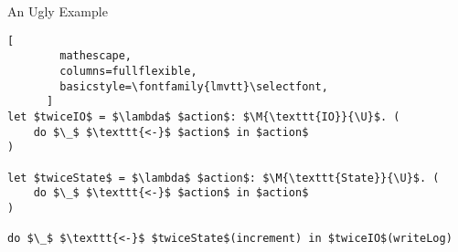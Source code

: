 
\begin{frame}[fragile]{An Ugly Example}
    \begin{lstlisting}[
        mathescape,
        columns=fullflexible,
        basicstyle=\fontfamily{lmvtt}\selectfont,
      ]
let $twiceIO$ = $\lambda$ $action$: $\M{\texttt{IO}}{\U}$. (
    do $\_$ $\texttt{<-}$ $action$ in $action$
)

let $twiceState$ = $\lambda$ $action$: $\M{\texttt{State}}{\U}$. (
    do $\_$ $\texttt{<-}$ $action$ in $action$
)

do $\_$ $\texttt{<-}$ $twiceState$(increment) in $twiceIO$(writeLog)
    \end{lstlisting}
\end{frame}
